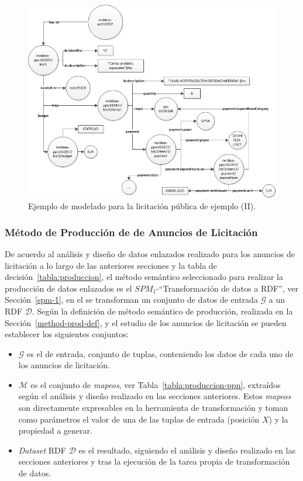 \cleardoublepage
\begin{figure}[!htp]
    \centering
	\includegraphics[width=16cm]{images/phd/modelo/hospital-2}
	\caption{Ejemplo de modelado para la licitación pública de ejemplo (II).}
	\label{fig:modelo-hospital-2}
\end{figure}
%

\subsubsection{Método de Producción de \linkeddata de Anuncios de Licitación}
De acuerdo al análisis y diseño de datos enlazados realizado para los anuncios de licitación
a lo largo de las anteriores secciones y la tabla de decisión~\ref{tabla:produccion}, el método semántico seleccionado 
para realizar la producción de datos enlazados es el $SPM_1$-``Transformación de datos a RDF'', ver Sección~\ref{spm-1}, en el 
se transforman un conjunto de datos de entrada $\mathcal{G}$ a un \dataset RDF $\mathcal{D}$. Según la definición de método 
semántico de producción, realizada en la Sección~\ref{method-prod-def}, y el estudio de los anuncios de licitación se pueden 
establecer los siguientes conjuntos:
\begin{itemize}
 \item $\mathcal{G}$ es el \dataset de entrada, conjunto de tuplas, conteniendo los datos de cada uno de los anuncios de licitación.
 \item $\mathcal{M}$ es el conjunto de \textit{mapeos}, ver Tabla~\ref{tabla:produccion-ppn}, extraídos según el análisis y diseño realizado en las secciones anteriores. Estos 
\textit{mapeos} son directamente expresables en la herramienta de transformación y toman como parámetros el valor de una de las tuplas de entrada (posición $X$) y la propiedad a generar.
 \item \textit{Dataset} \gls{RDF} $\mathcal{D}$ es el \dataset resultado, siguiendo el análisis y diseño realizado en las secciones anteriores y tras la ejecución 
de la tarea propia de transformación de datos.
\end{itemize}
% 


